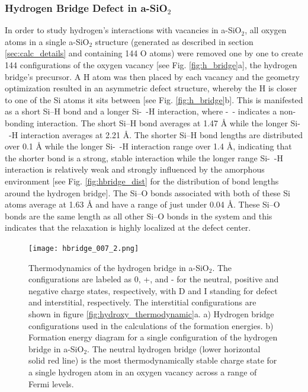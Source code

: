 \documentclass[aps,prb,reprint,superscriptaddress,showpacs]{revtex4-1}
\begin{document}
\subsubsection{Hydrogen Bridge Defect in a-SiO$_2$}

In order to study hydrogen's interactions with vacancies in a-SiO$_2$, all oxygen atoms in a single a-SiO$_2$ structure (generated as described in section \ref{sec:calc_details} and containing 144 O atoms) were removed one by one to create 144 configurations of the oxygen vacancy [see Fig. \ref{fig:h_bridge}a], the hydrogen bridge's precursor. A H atom was then placed by each vacancy and the geometry optimization resulted in an asymmetric defect structure, whereby the H is closer to one of the Si atoms it sits between [see Fig. \ref{fig:h_bridge}b]. This is manifested as a short \mbox{Si--H} bond and a longer \mbox{Si- -H} interaction, where \mbox{-  -} indicates a non-bonding interaction. The short \mbox{Si--H} bond averages at 1.47 {\AA} while the longer \mbox{Si-  -H} interaction averages at 2.21 {\AA}. The shorter \mbox{Si--H} bond lengths are distributed over 0.1 {\AA} while the longer \mbox{Si- -H} interaction range over 1.4 {\AA}, indicating that the shorter bond is a strong, stable interaction while the longer range \mbox{Si- -H} interaction is relatively weak and strongly influenced by the amorphous environment [see Fig. \ref{fig:hbridge_dist} for the distribution of bond lengths around the hydrogen bridge]. The \mbox{Si--O} bonds associated with both of these Si atoms average at 1.63 {\AA} and have a range of just under 0.04 {\AA}. These \mbox{Si--O} bonds are the same length as all other \mbox{Si--O} bonds in the system and this indicates that the relaxation is highly localized at the defect center. 

\begin{figure}[h!]
\texttt{[image: hbridge\_007\_2.png]}
\caption{Thermodynamics of the hydrogen bridge in a-SiO$_2$. The configurations are labeled as 0, +, and - for the neutral, positive and negative charge states, respectively, with D and I standing for defect and interstitial, respectively. The interstitial configurations are shown in figure \ref{fig:hydroxy_thermodynamic}a. a) Hydrogen bridge configurations used in the calculations of the formation energies. b) Formation energy diagram for a single configuration of the hydrogen bridge in a-SiO$_2$. The neutral hydrogen bridge (lower horizontal solid red line) is the most thermodynamically stable charge state for a single hydrogen atom in an oxygen vacancy across a range of Fermi levels.}
\label{fig:hbridge_formation}
\end{figure}
\end{document}
